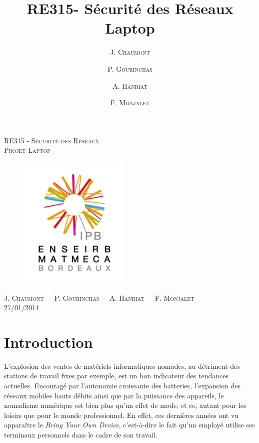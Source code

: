 \documentclass[12pt,a4paper]{article}
\author{J. \textsc{Chaumont} \and P. \textsc{Gourinchas} \and \textsc{A. Hanriat} \and \textsc{F. Monjalet}}
\title{RE315- Sécurité des Réseaux\\Laptop}
\begin{document}
\thispagestyle{empty}
\begin{center}

\LARGE{\textsc{RE315 - Sécurité des Réseaux}}\\[0.8cm]
\Large{\textsc{Projet Laptop}}

\vspace*{0.5cm}

\begin{figure}[H]
	\begin{center}
		\includegraphics[width=200px]{img/logo.jpg}
	\end{center}
\end{figure}

\vspace*{0.3cm}
\Large{J. \textsc{Chaumont}\ \ \ P. \textsc{Gourinchas}\ \ \ \textsc{A. Hanriat}\ \ \ \textsc{F. Monjalet}}\\
\vspace*{1cm}
\large{27/01/2014}



\end{center}

\clearpage
\tableofcontents
\clearpage


\section*{Introduction}

L'explosion des ventes de matériels informatiques nomades, au détriment des stations de travail fixes par exemple, est un bon indicateur des tendances actuelles. Encouragé par l'autonomie croissante des batteries, l'expansion des réseaux mobiles hauts débits ainsi que par la puissance des appareils, le nomadisme numérique est bien plus qu'un effet de mode, et ce, autant pour les loisirs que pour le monde professionnel. En effet, ces dernières années ont vu apparaître le \textit{Bring Your Own Device}, c'est-à-dire le fait qu'un employé utilise ses terminaux personnels dans le cadre de son travail.
\end{document}
